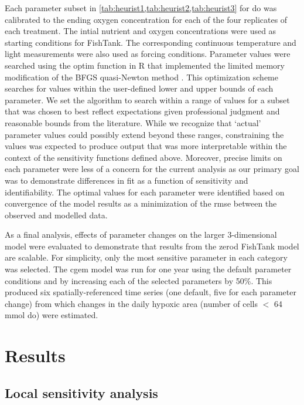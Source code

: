 \documentclass[review]{elsarticle}\usepackage[]{graphicx}\usepackage[]{color}
\begin{document}
Each parameter subset in \cref{tab:heurist1,tab:heurist2,tab:heurist3} for \ac{do} was calibrated to the ending oxygen concentration for each of the four replicates of each treatment. The intial nutrient and oxygen concentrations were used as starting conditions for FishTank.  The corresponding continuous temperature and light measurements were also used as forcing conditions.  Parameter values were searched using the optim function in R that implemented the limited memory modification of the BFGS quasi-Newton method \citep{Byrd95,Nocedal06,RDCT17}.  This optimization scheme searches for values within the user-defined lower and upper bounds of each parameter.  We set the algorithm to search within a range of values for a subset that was chosen to best reflect expectations given professional judgment and reasonable bounds from the literature.  While we recognize that `actual' parameter values could possibly extend beyond these ranges, constraining the values was expected to produce output that was more interpretable within the context of the sensitivity functions defined above.  Moreover, precise limits on each parameter were less of a concern for the current analysis as our primary goal was to demonstrate differences in fit as a function of sensitivity and identifiability.  The optimal values for each parameter were identified based on convergence of the model results as a minimization of the \ac{rmse} between the observed and modelled data.    

As a final analysis, effects of parameter changes on the larger 3-dimensional model were evaluated to demonstrate that results from the \ac{zerod} FishTank model are scalable.  For simplicity, only the most sensitive parameter in each category was selected.  The \ac{cgem} model was run for one year using the default parameter conditions and by increasing each of the selected parameters by 50\%.  This produced six spatially-referenced time series (one default, five for each parameter change) from which changes in the daily hypoxic area (number of cells $<$ 64 mmol \ac{do}) were estimated.

\section{Results}


 
\subsection{Local sensitivity analysis}
\end{document}
